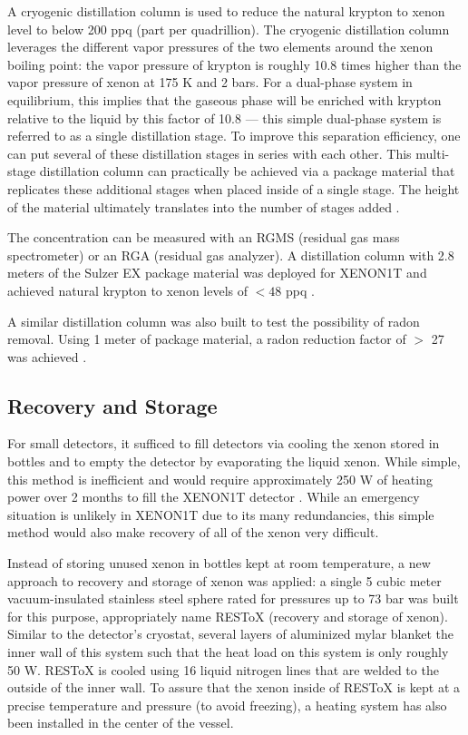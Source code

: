  A cryogenic distillation column is used to reduce the natural krypton to xenon level to below 200 ppq (part per quadrillion).  The cryogenic distillation column leverages the different vapor pressures of the two elements around the xenon boiling point: the vapor pressure of krypton is roughly 10.8 times higher than the vapor pressure of xenon at 175 K and 2 bars.  For a dual-phase system in equilibrium, this implies that the gaseous phase will be enriched with krypton relative to the liquid by this factor of 10.8 --- this simple dual-phase system is referred to as a single distillation stage.  To improve this separation efficiency, one can put several of these distillation stages in series with each other.  This multi-stage distillation column can practically be achieved via a package material that replicates these additional stages when placed inside of a single stage.  The height of the material ultimately translates into the number of stages added \cite{fieguth2016distillation}.
 
 The concentration can be measured with an RGMS (residual gas mass spectrometer) or an RGA (residual gas analyzer).  A distillation column with 2.8 meters of the Sulzer EX package material was deployed for XENON1T and achieved natural krypton to xenon levels of $< 48$ ppq \cite{aprile2017removing}.  
 
 A similar distillation column was also built to test the possibility of radon removal.  Using 1 meter of package material, a radon reduction factor of $>$ 27 was achieved \cite{aprile2017online}.
 
 
  \subsection{Recovery and Storage}
 
 For small detectors, it sufficed to fill detectors via cooling the xenon stored in bottles and to empty the detector by evaporating the liquid xenon.  While simple, this method is inefficient and would require approximately 250 W of heating power over 2 months to fill the XENON1T detector \cite{aprile2017xenon1t}.  While an emergency situation is unlikely in XENON1T due to its many redundancies, this simple method would also make recovery of all of the xenon very difficult.
 
 Instead of storing unused xenon in bottles kept at room temperature, a new approach to recovery and storage of xenon was applied: a single 5 cubic meter vacuum-insulated stainless steel sphere rated for pressures up to 73 bar was built for this purpose, appropriately name RESToX (recovery and storage of xenon).  Similar to the detector's cryostat, several layers of aluminized mylar blanket the inner wall of this system such that the heat load on this system is only roughly 50 W.  RESToX is cooled using 16 liquid nitrogen lines that are welded to the outside of the inner wall.  To assure that the xenon inside of RESToX is kept at a precise temperature and pressure (to avoid freezing), a heating system has also been installed in the center of the vessel.
 

